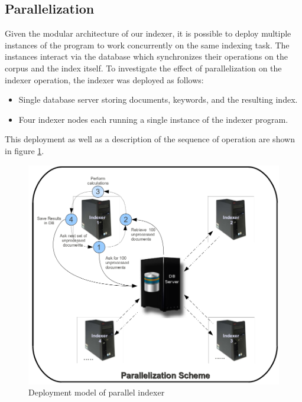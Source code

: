 \documentclass[10pt]{report}
\begin{document}
\subsection{Parallelization}
\label{parallelization}
Given the modular architecture of our indexer, it is possible to
deploy multiple instances of the program to work concurrently on the same
indexing task. The instances interact via the database which
synchronizes their operations on the corpus and the index itself. To
investigate the effect of parallelization on the indexer operation, the
indexer was deployed as follows:

\begin{itemize}
\item Single database server storing documents, keywords, and the
  resulting index.
\item Four indexer nodes each running a single instance of the indexer
  program. 
\end{itemize}

This deployment as well as a description of the sequence of operation
are shown in figure \ref{fig:paralleldeploymentmodel}.

\begin{figure}[h]
  \begin{center}
    \includegraphics[width=\textwidth,height=!]{paralleldeploymentmodel}
  \end{center}
  \caption{Deployment model of parallel indexer} 
  \label{fig:paralleldeploymentmodel}
\end{figure}
\end{document}
